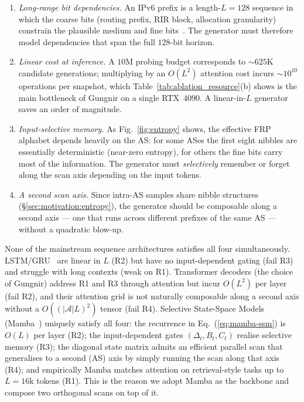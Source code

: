 \documentclass[conference]{IEEEtran}
\begin{document}
\begin{enumerate}
   \item[\textbf{R1}] \emph{Long-range bit dependencies.}  An
   IPv6 prefix is a length-$L{=}128$ sequence in which the
   coarse bits (routing prefix, RIR block, allocation
   granularity) constrain the plausible medium and fine
bits~\cite{hinden2006rfc4291,deering1998ipv6}.  The generator must therefore
   model dependencies that span the full $128$-bit horizon.

   \item[\textbf{R2}] \emph{Linear cost at inference.}
   A $10$M probing budget corresponds to
   $\sim\!625$K candidate generations; multiplying by an
   $O(L^2)$ attention cost incurs
   $\sim\!10^{10}$ operations per snapshot, which
Table~\ref{tab:ablation_resource}(b) shows is the main bottleneck of
   Gungnir on a single RTX~4090.  A linear-in-$L$
   generator saves an order of magnitude.

   \item[\textbf{R3}] \emph{Input-selective memory.}
   As Fig.~\ref{fig:entropy} shows, the effective FRP alphabet
   depends heavily on the AS: for some ASes the first eight
   nibbles are essentially deterministic (near-zero entropy),
   for others the fine bits carry most of the information.
   The generator must \emph{selectively} remember or forget
   along the scan axis depending on the input tokens.

   \item[\textbf{R4}] \emph{A second scan axis.}
   Since intra-AS samples share nibble structures
   (\S\ref{sec:motivation:entropy}), the generator should be
   composable along a second axis --- one that runs across
   different prefixes of the same AS --- without a quadratic
   blow-up.
\end{enumerate}

None of the mainstream sequence architectures satisfies all
four simultaneously.  LSTM/GRU~\cite{gu2023mamba,medsker2001rnn} are linear
in $L$ (R2) but have no input-dependent gating (fail R3) and
struggle with long contexts (weak on R1).  Transformer decoders
(the choice of Gungnir) address R1 and R3 through attention
but incur $O(L^2)$ per layer (fail R2), and their
attention grid is not naturally composable along a second axis
without a $O((|\mathcal{A}|L)^2)$ tensor (fail R4).
Selective State-Space Models (Mamba~\cite{gu2023mamba,gu2021s4})
uniquely satisfy all four: the recurrence in
Eq.~(\ref{eq:mamba-ssm}) is $O(L)$ per layer (R2); the
input-dependent gates $(\Delta_t,B_t,C_t)$ realise selective
memory (R3); the diagonal state matrix admits an efficient
parallel scan that generalises to a second (AS) axis by simply
running the scan along that axis (R4); and empirically Mamba
matches attention on retrieval-style tasks up to
$L\!=\!16$k tokens (R1).  This is the reason we adopt Mamba
as the backbone and compose two orthogonal scans on top of it.
\end{document}

